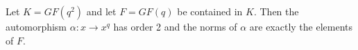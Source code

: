 Let $K = GF(q^2)$ and let $F = GF(q)$ be contained in $K$. Then the automorphism $\alpha : x \rightarrow x^q$ has order 2 and the norms of $\alpha$ are exactly the elements of $F$.